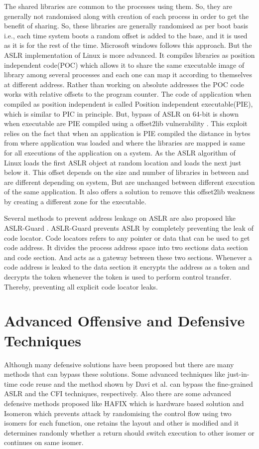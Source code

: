 \documentclass{article}
\begin{document}
\begin{multicols}{2}
	The shared libraries are common to the processes using them. So, they are generally not randomised along with creation of each process in order to get the benefit of sharing. So, these libraries are generally randomised as per boot basis i.e., each time system boots a random offset is added to the base, and it is used as it is for the rest of the time. Microsoft windows follows this approach. But the ASLR implementation of Linux is more advanced. It compiles libraries as position independent code(POC) which allows it to share the same executable image of library among several processes and each one can map it according to themselves at different address. Rather than working on absolute addresses the POC code works with relative offsets to the program counter. The code of application when compiled as position independent is called Position independent executable(PIE), which is similar to PIC in principle. But, bypass of ASLR on 64-bit is shown when executable are PIE compiled using a offset2lib vulnerability \cite{effaslr64}. This exploit relies on the fact that when an application is PIE compiled the distance in bytes from where application was loaded and where the libraries are mapped is same for all executions of the application on a system. As the ASLR algorithm of Linux loads the first ASLR object at random location and loads the next just below it. This offset depends on the size and number of libraries in between and are different depending on system, But are unchanged between different execution of the same application. It also offers a solution to remove this offset2lib weakness by creating a different zone for the executable.
	
	Several methods to prevent address leakage on ASLR are also proposed like ASLR-Guard \cite{aslrguard}. ASLR-Guard prevents ASLR by completely preventing the leak of code locator. Code locators refers to any pointer or data that can be used to get code address. It divides the process address space into two sections data section and code section. And acts as a gateway between these two sections. Whenever a code address is leaked to the data section it encrypts the address as a token and decrypts the token whenever the token is used to perform control transfer. Thereby, preventing all explicit code locator leaks.
	
	\section{Advanced Offensive and Defensive Techniques}
	Although many defensive solutions have been proposed but there are many methods that can bypass these solutions. Some advanced techniques like just-in-time code reuse \cite{jitrop} and the method shown by Davi et al. \cite{effcfi} can bypass the fine-grained ASLR and the CFI techniques, respectively. Also there are some advanced defensive methods proposed like HAFIX \cite{hafix} which is hardware based solution and Isomeron which prevents attack by randomising the control flow using two isomers for each function, one retains the layout and other is modified and it determines randomly whether a return should switch execution to other isomer or continues on same isomer.
	

\end{multicols}
\end{document}
